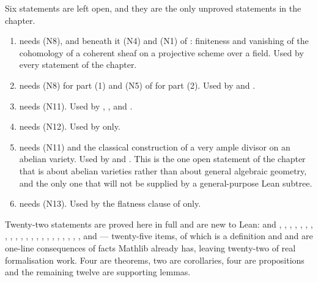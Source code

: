Six statements are left open, and they are the only unproved statements in the
chapter.
\begin{enumerate}
  \item {} needs (N8), and beneath it (N4)
  and (N1) of : finiteness and vanishing of the cohomology
  of a coherent sheaf on a projective scheme over a field.  Used by every
  statement of the chapter.
  \item {} needs (N8) for part (1) and
  (N5) of  for part (2).  Used by
   and .
  \item {} needs (N11).  Used by
  , ,
   and .
  \item {} needs (N12).  Used by
   only.
  \item {} needs (N11) and the classical
  construction of a very ample divisor on an abelian variety.  Used by
   and .  This is
  the one open statement of the chapter that is about abelian varieties rather
  than about general algebraic geometry, and the only one that will not be
  supplied by a general-purpose Lean subtree.
  \item {} needs (N13).  Used by the flatness
  clause of  only.
\end{enumerate}

Twenty-two statements are proved here in full and are new to Lean:
 and ,
,
,
,
,
,
,
,
,
,
,
,
,
,
,
,
,
,
,
,
,
,
 and
 --- twenty-five items, of which
 is a definition and  and
 are one-line consequences of facts Mathlib already
has, leaving twenty-two of real formalisation work.  Four are theorems, two are
corollaries, four are propositions and the remaining twelve are supporting
lemmas.

